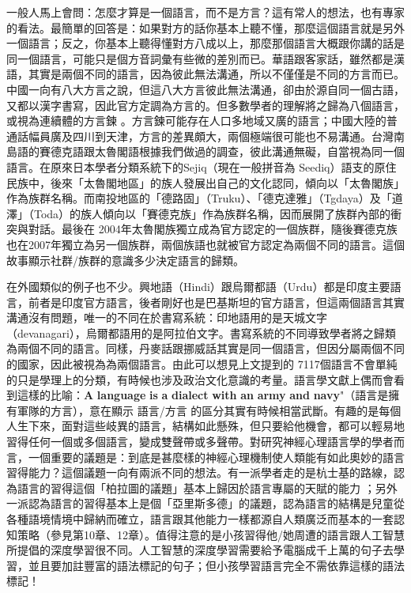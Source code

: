 一般人馬上會問：怎麼才算是一個語言，而不是方言？這有常人的想法，也有專家的看法。最簡單的回答是：如果對方的話你基本上聽不懂，那麼這個語言就是另外一個語言；反之，你基本上聽得懂對方八成以上，那麼那個語言大概跟你講的話是同一個語言，可能只是個方音詞彙有些微的差別而已。華語跟客家話，雖然都是漢語，其實是兩個不同的語言，因為彼此無法溝通，所以不僅僅是不同的方言而已。中國一向有八大方言之說，但這八大方言彼此無法溝通，卻由於源自同一個古語，又都以漢字書寫，因此官方定調為方言的。但多數學者的理解將之歸為八個語言，或視為連續體的方言鍊 。方言鍊可能存在人口多地域又廣的語言；中國大陸的普通話幅員廣及四川到天津，方言的差異頗大，兩個極端很可能也不易溝通。台灣南島語的賽德克語跟太魯閣語根據我們做過的調查，彼此溝通無礙，自當視為同一個語言。在原來日本學者分類系統下的Sejiq（現在一般拼音為 Seediq）語支的原住民族中，後來「太魯閣地區」的族人發展出自己的文化認同，傾向以「太魯閣族」作為族群名稱。而南投地區的「德路固」（Truku）、「德克達雅」（Tgdaya）及「道澤」（Toda）的族人傾向以「賽德克族」作為族群名稱，因而展開了族群內部的衝突與對話。最後在 2004年太魯閣族獨立成為官方認定的一個族群，隨後賽德克族也在2007年獨立為另一個族群，兩個族語也就被官方認定為兩個不同的語言。這個故事顯示社群/族群的意識多少決定語言的歸類。

在外國類似的例子也不少。興地語（Hindi）跟烏爾都語（Urdu）都是印度主要語言，前者是印度官方語言，後者剛好也是巴基斯坦的官方語言，但這兩個語言其實溝通沒有問題，唯一的不同在於書寫系統：印地語用的是天城文字（devanagari），烏爾都語用的是阿拉伯文字。書寫系統的不同導致學者將之歸類為兩個不同的語言。同樣，丹麥話跟挪威話其實是同一個語言，但因分屬兩個不同的國家，因此被視為為兩個語言。由此可以想見上文提到的 7117個語言不會單純的只是學理上的分類，有時候也涉及政治文化意識的考量。語言學文獻上偶而會看到這樣的比喻：\textbf{A} \textbf{language} \textbf{is} \textbf{a} \textbf{dialect} \textbf{with} \textbf{an} \textbf{army} \textbf{and} \textbf{navy}"（語言是擁有軍隊的方言），意在顯示 語言/方言 的區分其實有時候相當武斷。有趣的是每個人生下來，面對這些岐異的語言，結構如此懸殊，但只要給他機會，都可以輕易地習得任何一個或多個語言，變成雙聲帶或多聲帶。對研究神經心理語言學的學者而言，一個重要的議題是：到底是甚麼樣的神經心理機制使人類能有如此奧妙的語言習得能力？這個議題一向有兩派不同的想法。有一派學者走的是杭士基的路線，認為語言的習得這個「柏拉圖的議題」基本上歸因於語言專屬的天賦的能力 ；另外一派認為語言的習得基本上是個「亞里斯多德」的議題，認為語言的結構是兒童從各種語境情境中歸納而確立，語言跟其他能力一樣都源自人類廣泛而基本的一套認知策略（參見第10章、12章）。值得注意的是小孩習得他/她周遭的語言跟人工智慧所提倡的深度學習很不同。人工智慧的深度學習需要給予電腦成千上萬的句子去學習，並且要加註豐富的語法標記的句子；但小孩學習語言完全不需依靠這樣的語法標記！

